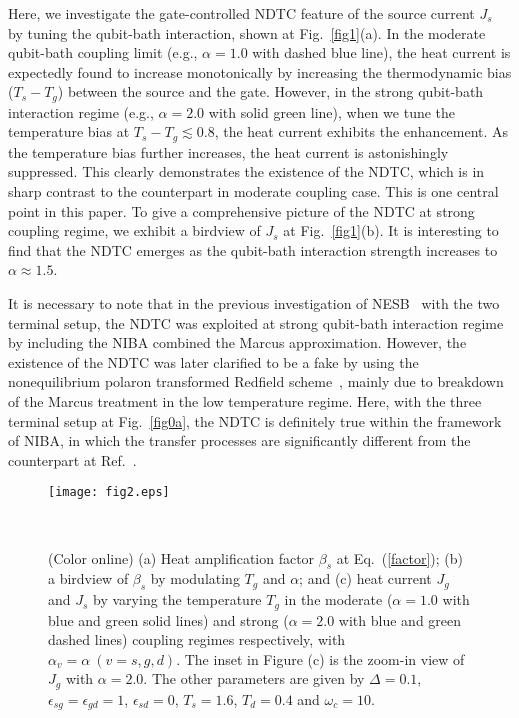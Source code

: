 \documentclass[twocolumn,preprintnumbers,amsmath,amssymb]{revtex4}
\begin{document}
Here, we investigate the gate-controlled NDTC feature of the source current $J_s$ by tuning the qubit-bath interaction, shown at Fig.~\ref{fig1}(a).
In the moderate qubit-bath coupling limit (e.g., $\alpha=1.0$ with dashed blue line), the heat current is expectedly found to increase monotonically by
increasing the thermodynamic bias ($T_s-T_g$) between the source and the gate.
However, in the strong qubit-bath interaction regime (e.g., $\alpha=2.0$ with solid green line),
when we tune the temperature bias at $T_s-T_g{\lesssim}0.8$, the heat current exhibits the enhancement.
As the temperature bias further increases, the heat current is astonishingly suppressed.
This clearly demonstrates the existence of the NDTC, which is in sharp contrast to the counterpart in moderate coupling case.
This is one central point in this paper.
To give a comprehensive picture of the NDTC at strong coupling regime, we exhibit a birdview of $J_s$ at Fig.~\ref{fig1}(b). It is interesting to find that the NDTC emerges as the qubit-bath interaction strength increases to $\alpha{\approx}1.5$.

It is necessary to note that in the previous investigation of NESB~\cite{dvirasegal2006prb} with the two terminal setup, the NDTC was exploited at strong qubit-bath interaction regime
by including the NIBA combined the Marcus approximation.
However, the existence of the NDTC was later clarified to be a fake by using the nonequilibrium polaron transformed Redfield scheme~\cite{cwang2015sr},
mainly due to breakdown of the Marcus treatment in the low temperature regime.
Here, with the three terminal setup at Fig.~\ref{fig0a}, the NDTC is definitely true within the framework of NIBA,
in which the transfer processes are significantly different from the counterpart at Ref.~\cite{dvirasegal2006prb}.

\begin{figure}[tbp]
\texttt{[image: fig2.eps]}
\caption{(Color online) (a) Heat amplification factor $\beta_s$ at Eq.~(\ref{factor});
(b) a birdview of $\beta_s$ by modulating $T_g$ and  $\alpha$;
and (c) heat current $J_g$ and $J_s$ by varying the temperature $T_g$ in the moderate ($\alpha=1.0$ with blue and green solid lines)
and strong ($\alpha=2.0$ with blue and green dashed lines) coupling regimes respectively, with $\alpha_v=\alpha~(v=s,g,d)$.
The inset in Figure (c) is the zoom-in view of $J_g$ with $\alpha=2.0$.
The other parameters are given by $\Delta=0.1$, $\epsilon_{sg}=\epsilon_{gd}=1$, $\epsilon_{sd}=0$, $T_s=1.6$, $T_d=0.4$ and $\omega_c=10$.
}~\label{fig2}
\end{figure}
\end{document}
